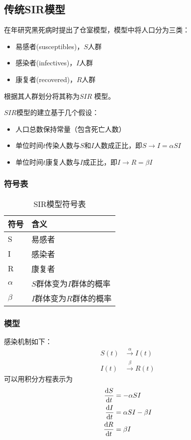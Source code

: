\subsection{传统SIR模型}
\citeauthor{对流行病数学理论的贡献}在\citeyear{对流行病数学理论的贡献}年研究黑死病时提出了仓室模型，模型中将人口分为三类：
\begin{itemize}
	\item 易感者(susceptibles)，$S$人群
	\item 感染者(infectives)，$I$人群
	\item 康复者(recovered)，$R$人群
\end{itemize}
\par 根据其人群划分将其称为$SIR$
\cite{对流行病数学理论的贡献}模型。
\par $SIR$模型的建立基于几个假设\cite{对流行病数学理论的贡献}：
\begin{itemize}
	\item 人口总数保持常量（包含死亡人数）
	\item 单位时间$t$传染人数与$S$和$I$人数成正比，即$S\to I = \alpha SI$
	\item 单位时间$t$康复人数与$I$成正比，即$I\to R = \beta I$
\end{itemize}
\subsubsection{符号表}
\begin{table}[H]
	\centering
	\caption{SIR模型符号表}
	\label{table:SIR模型符号表}
	\begin{tabular}{ll}
		\hline
		符号&含义\\
		\hline
		S&易感者\\
		I&感染者\\
		R&康复者\\
		$\alpha$&$S$群体变为$I$群体的概率\\
		$\beta$&$I$群体变为$R$群体的概率\\
		\hline
	\end{tabular}
\end{table}
\subsubsection{模型}
\par 感染机制如下：
\begin{align}
S(t)&\xrightarrow \alpha I(t)\\
I(t)&\xrightarrow \beta R(t)
\end{align}
可以用积分方程表示为
\begin{align}
\frac{\mathrm{d}S}{\mathrm{d}t} &= -\alpha SI\\
\frac{\mathrm{d}I}{\mathrm{d}t} &= \alpha SI - \beta I\\
\frac{\mathrm{d}R}{\mathrm{d}t} &= \beta I
\end{align}
